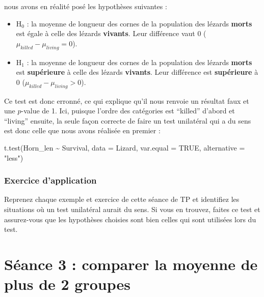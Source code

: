 \documentclass[
  a4paper,
]{article}
\newenvironment{Shaded}{\begin{snugshade}}{\end{snugshade}}
\newcommand{\AttributeTok}[1]{\textcolor[rgb]{0.00,0.34,0.68}{#1}}
\newcommand{\ConstantTok}[1]{\textcolor[rgb]{0.67,0.33,0.00}{#1}}
\newcommand{\FunctionTok}[1]{\textcolor[rgb]{0.39,0.29,0.61}{#1}}
\newcommand{\NormalTok}[1]{\textcolor[rgb]{0.12,0.11,0.11}{#1}}
\newcommand{\SpecialCharTok}[1]{\textcolor[rgb]{0.24,0.68,0.91}{#1}}
\newcommand{\StringTok}[1]{\textcolor[rgb]{0.75,0.01,0.01}{#1}}
\providecommand{\tightlist}{%
  \setlength{\itemsep}{0pt}\setlength{\parskip}{0pt}}
\begin{document}
nous avons en réalité posé les hypothèses suivantes :

\begin{itemize}
\tightlist
\item
  H\(_0\) : la moyenne de longueur des cornes de la population des lézards \textbf{morts} est égale à celle des lézards \textbf{vivants}. Leur différence vaut 0 (\(\mu_{killed}-\mu_{living} = 0\)).
\item
  H\(_1\) : la moyenne de longueur des cornes de la population des lézards \textbf{morts} est \textbf{supérieure} à celle des lézards \textbf{vivants}. Leur différence est \textbf{supérieure} à 0 (\(\mu_{killed}-\mu_{living} > 0\)).
\end{itemize}

Ce test est donc erronné, ce qui explique qu'il nous renvoie un résultat faux et une \(p\)-value de 1. Ici, puisque l'ordre des catégories est ``killed'' d'abord et ``living'' ensuite, la seule façon correcte de faire un test unilatéral qui a du sens est donc celle que nous avons réalisée en premier :

\begin{Shaded}
\begin{Highlighting}[]
\FunctionTok{t.test}\NormalTok{(Horn\_len }\SpecialCharTok{\textasciitilde{}}\NormalTok{ Survival, }
       \AttributeTok{data =}\NormalTok{ Lizard, }\AttributeTok{var.equal =} \ConstantTok{TRUE}\NormalTok{,}
       \AttributeTok{alternative =} \StringTok{"less"}\NormalTok{)}
\end{Highlighting}
\end{Shaded}

\hypertarget{exercice-dapplication-3}{%
\subsubsection{Exercice d'application}\label{exercice-dapplication-3}}

Reprenez chaque exemple et exercice de cette séance de TP et identifiez les situations où un test unilatéral aurait du sens. Si vous en trouvez, faites ce test et assurez-vous que les hypothèses choisies sont bien celles qui sont utilisées lors du test.

\hypertarget{suxe9ance-3-comparer-la-moyenne-de-plus-de-2-groupes}{%
\section{Séance 3 : comparer la moyenne de plus de 2 groupes}\label{suxe9ance-3-comparer-la-moyenne-de-plus-de-2-groupes}}
\end{document}
